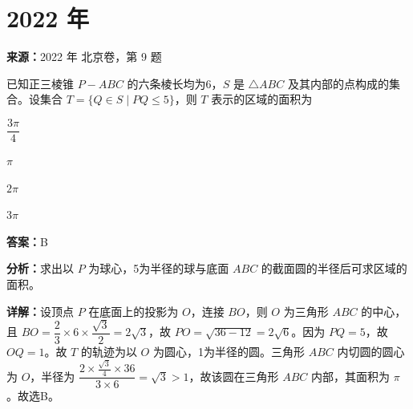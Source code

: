 \section*{2022 年}

\begin{question}[points=4]
\textbf{来源：}2022 年 北京卷，第 9 题\par
已知正三棱锥 $P-ABC$ 的六条棱长均为6，$S$ 是 $\triangle ABC$ 及其内部的点构成的集合。设集合 $T = \{ Q \in S \mid PQ \leq 5 \}$，则 $T$ 表示的区域的面积为
\begin{choices}
  \item $\dfrac{3\pi}{4}$
  \item $\pi$
  \item $2\pi$
  \item $3\pi$
\end{choices}
\begin{solution}
\textbf{答案：}B

\textbf{分析：}求出以 $P$ 为球心，5为半径的球与底面 $ABC$ 的截面圆的半径后可求区域的面积。

\textbf{详解：}设顶点 $P$ 在底面上的投影为 $O$，连接 $BO$，则 $O$ 为三角形 $ABC$ 的中心，且 $BO = \dfrac{2}{3} \times 6 \times \dfrac{\sqrt{3}}{2} = 2\sqrt{3}$，故 $PO = \sqrt{36 - 12} = 2\sqrt{6}$。因为 $PQ = 5$，故 $OQ = 1$。故 $T$ 的轨迹为以 $O$ 为圆心，1为半径的圆。三角形 $ABC$ 内切圆的圆心为 $O$，半径为 $\dfrac{2 \times \frac{\sqrt{3}}{4} \times 36}{3 \times 6} = \sqrt{3} > 1$，故该圆在三角形 $ABC$ 内部，其面积为 $\pi$。故选B。
\end{solution}
\end{question}

